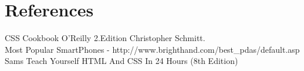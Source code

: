 \section{References}
CSS Cookbook O'Reilly 2.Edition Christopher Schmitt. \\
Most Popular SmartPhones - http://www.brighthand.com/best\_pdas/default.asp \\
Sams Teach Yourself HTML And CSS In 24 Hours (8th Edition)\\

